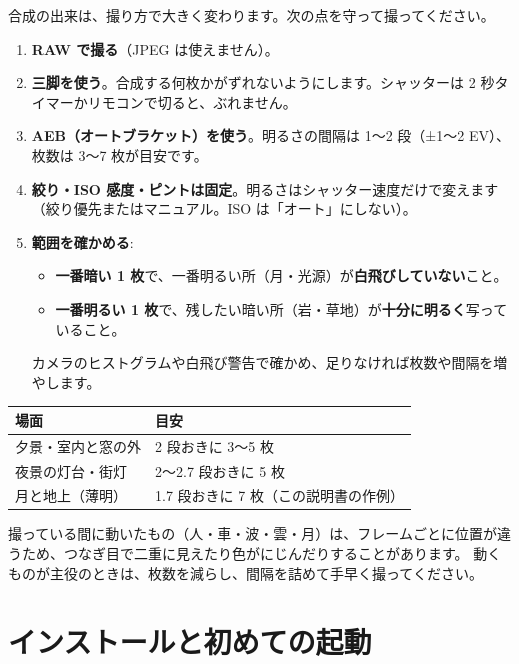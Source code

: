 \documentclass[paper=a4paper,fontsize=11pt,report,jafontsize=11pt]{jlreq}
\begin{document}
合成の出来は、撮り方で大きく変わります。次の点を守って撮ってください。

\begin{enumerate}
  \item \textbf{RAW で撮る}（JPEG は使えません）。
  \item \textbf{三脚を使う}。合成する何枚かがずれないようにします。シャッターは 2 秒タイマーかリモコンで切ると、ぶれません。
  \item \textbf{AEB（オートブラケット）を使う}。明るさの間隔は 1〜2 段（±1〜2 EV）、枚数は 3〜7 枚が目安です。
  \item \textbf{絞り・ISO 感度・ピントは固定}。明るさはシャッター速度だけで変えます（絞り優先またはマニュアル。ISO は「オート」にしない）。
  \item \textbf{範囲を確かめる}:
    \begin{itemize}
      \item \textbf{一番暗い 1 枚}で、一番明るい所（月・光源）が\textbf{白飛びしていない}こと。
      \item \textbf{一番明るい 1 枚}で、残したい暗い所（岩・草地）が\textbf{十分に明るく}写っていること。
    \end{itemize}
    カメラのヒストグラムや白飛び警告で確かめ、足りなければ枚数や間隔を増やします。
\end{enumerate}

\begin{tip}[枚数と間隔の目安]
\begin{tabularx}{\linewidth}{lX}
  \toprule
  場面 & 目安 \\ \midrule
  夕景・室内と窓の外 & 2 段おきに 3〜5 枚 \\
  夜景の灯台・街灯 & 2〜2.7 段おきに 5 枚 \\
  月と地上（薄明） & 1.7 段おきに 7 枚（この説明書の作例） \\
  \bottomrule
\end{tabularx}
\end{tip}

\begin{warn}[動くものに注意]
撮っている間に動いたもの（人・車・波・雲・月）は、フレームごとに位置が違うため、つなぎ目で二重に見えたり色がにじんだりすることがあります。
動くものが主役のときは、枚数を減らし、間隔を詰めて手早く撮ってください。
\end{warn}

\chapter{インストールと初めての起動}
\end{document}
